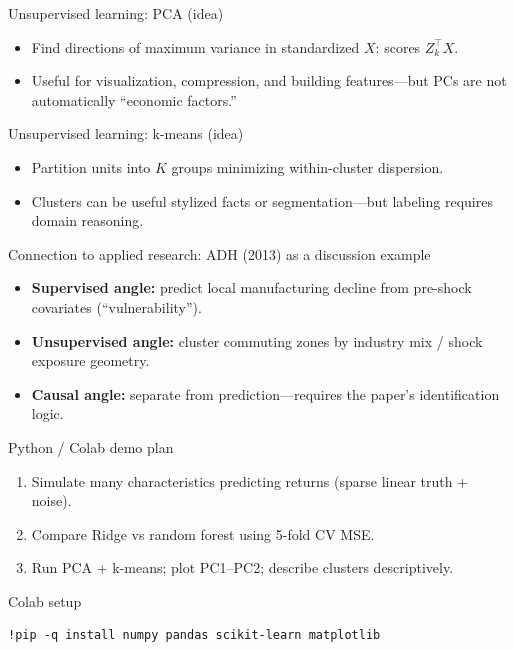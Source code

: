 \documentclass[aspectratio=169,11pt]{beamer}
\begin{document}
\begin{frame}{Unsupervised learning: PCA (idea)}
  \begin{itemize}
    \item Find directions of maximum variance in standardized \(X\): scores \(Z_k^\top X\).
    \item Useful for visualization, compression, and building features---but PCs are not automatically ``economic factors.''
  \end{itemize}
\end{frame}

\begin{frame}{Unsupervised learning: k-means (idea)}
  \begin{itemize}
    \item Partition units into \(K\) groups minimizing within-cluster dispersion.
    \item Clusters can be useful stylized facts or segmentation---but labeling requires domain reasoning.
  \end{itemize}
\end{frame}

\begin{frame}{Connection to applied research: ADH (2013) as a discussion example}
  \begin{itemize}
    \item \textbf{Supervised angle:} predict local manufacturing decline from pre-shock covariates (``vulnerability'').
    \item \textbf{Unsupervised angle:} cluster commuting zones by industry mix / shock exposure geometry.
    \item \textbf{Causal angle:} separate from prediction---requires the paper’s identification logic.
  \end{itemize}
\end{frame}

\begin{frame}{Python / Colab demo plan}
  \begin{enumerate}
    \item Simulate many characteristics predicting returns (sparse linear truth + noise).
    \item Compare Ridge vs random forest using 5-fold CV MSE.
    \item Run PCA + k-means; plot PC1--PC2; describe clusters descriptively.
  \end{enumerate}
\end{frame}

\begin{frame}[fragile]{Colab setup}
  \begin{verbatim}
!pip -q install numpy pandas scikit-learn matplotlib
  \end{verbatim}
\end{frame}
\end{document}
